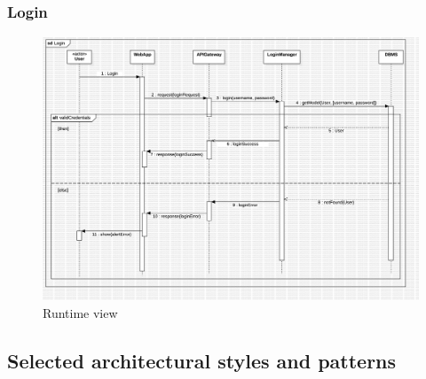 \subsubsection*{Login}
\begin{figure}[H]
    \centering
    \includegraphics[width=\textwidth]{Diagrams/LoginSD.jpg}
    \caption{Runtime view}
    \label{fig:runtime_view}
\end{figure}
\subsection{Selected architectural styles and patterns}
